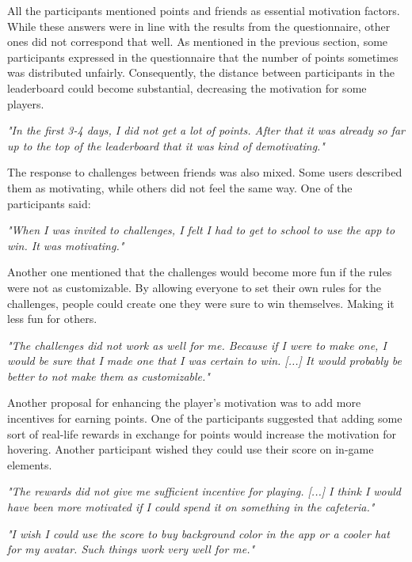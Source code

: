 All the participants mentioned points and friends as essential motivation factors. While these answers were in line with the results from the questionnaire, other ones did not correspond that well. As mentioned in the previous section, some participants expressed in the questionnaire that the number of points sometimes was distributed unfairly. Consequently, the distance between participants in the leaderboard could become substantial, decreasing the motivation for some players.

\textit{
"In the first 3-4 days, I did not get a lot of points. After that it was already so far up to the top of the leaderboard that it was kind of demotivating." \footnotemark[\value{footnote}]}

The response to challenges between friends was also mixed. Some users described them as motivating, while others did not feel the same way. One of the participants said:

\textit{"When I was invited to challenges, I felt I had to get to school to use the app to win. It was motivating." \footnotemark[\value{footnote}]}

Another one mentioned that the challenges would become more fun if the rules were not as customizable. By allowing everyone to set their own rules for the challenges, people could create one they were sure to win themselves. Making it less fun for others.

\textit{"The challenges did not work as well for me. Because if I were to make one, I would be sure that I made one that I was certain to win. [...] It would probably be better to not make them as customizable." \footnotemark[\value{footnote}]}

Another proposal for enhancing the player’s motivation was to add more incentives for earning points. One of the participants suggested that adding some sort of real-life rewards in exchange for points would increase the motivation for hovering. Another participant wished they could use their score on in-game elements.

\textit{"The rewards did not give me sufficient incentive for playing. [...] I think I would have been more motivated if I could spend it on something in the cafeteria." \footnotemark[\value{footnote}]}

\textit{"I wish I could use the score to buy background color in the app or a cooler hat for my avatar. Such things work very well for me." \footnotemark[\value{footnote}]}

